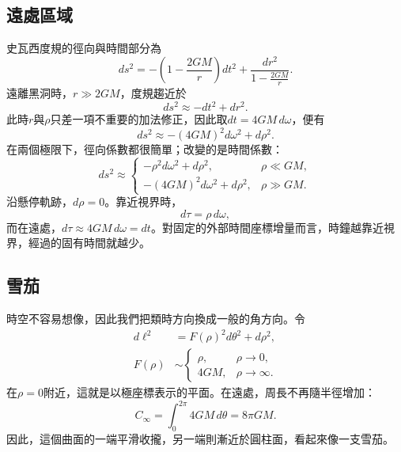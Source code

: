 \subsection{遠處區域}

史瓦西度規的徑向與時間部分為
\begin{equation}
ds^2
=-\left(1-\frac{2GM}{r}\right)dt^2
+\frac{dr^2}{1-\frac{2GM}{r}}.
\label{eq:l04-schwarzschild}
\end{equation}
遠離黑洞時，\(r\gg2GM\)，度規趨近於
\begin{equation}
ds^2\approx-dt^2+dr^2.
\end{equation}
此時\(r\)與\(\rho\)只差一項不重要的加法修正，因此取\(dt=4GM\,d\omega\)，便有
\begin{equation}
ds^2\approx-(4GM)^2d\omega^2+d\rho^2.
\label{eq:l04-far}
\end{equation}
在兩個極限下，徑向係數都很簡單；改變的是時間係數：
\begin{equation}
ds^2\approx
\begin{cases}
-\rho^2d\omega^2+d\rho^2, & \rho\ll GM,\\[3pt]
-(4GM)^2d\omega^2+d\rho^2, & \rho\gg GM.
\end{cases}
\label{eq:l04-two-limits}
\end{equation}
沿懸停軌跡，\(d\rho=0\)。靠近視界時，
\begin{equation}
d\tau=\rho\,d\omega,
\end{equation}
而在遠處，\(d\tau\approx4GM\,d\omega=dt\)。對固定的外部時間座標增量而言，時鐘越靠近視界，經過的固有時間就越少。

\subsection{雪茄}

時空不容易想像，因此我們把類時方向換成一般的角方向。令
\begin{equation}
\begin{aligned}
d\ell^2&=F(\rho)^2d\theta^2+d\rho^2,\\
F(\rho)&\sim
\begin{cases}
\rho, & \rho\to0,\\
4GM, & \rho\to\infty.
\end{cases}
\end{aligned}
\label{eq:l04-cigar}
\end{equation}
在\(\rho=0\)附近，這就是以極座標表示的平面。在遠處，周長不再隨半徑增加：
\begin{equation}
C_\infty=\int_0^{2\pi}4GM\,d\theta=8\pi GM.
\label{eq:l04-cigar-circumference}
\end{equation}
因此，這個曲面的一端平滑收攏，另一端則漸近於圓柱面，看起來像一支雪茄。

